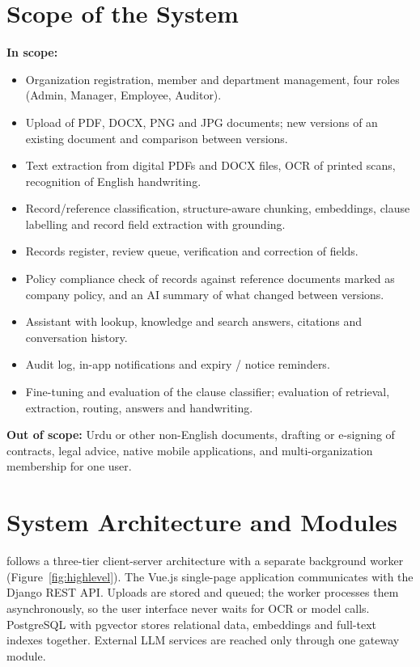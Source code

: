 \section{Scope of the System}
\textbf{In scope:}
\begin{itemize}
\item Organization registration, member and department management, four roles (Admin, Manager,
Employee, Auditor).
\item Upload of PDF, DOCX, PNG and JPG documents; new versions of an existing document and comparison
between versions.
\item Text extraction from digital PDFs and DOCX files, OCR of printed scans, recognition of English
handwriting.
\item Record/reference classification, structure-aware chunking, embeddings, clause labelling and record
field extraction with grounding.
\item Records register, review queue, verification and correction of fields.
\item Policy compliance check of records against reference documents marked as company policy, and an
AI summary of what changed between versions.
\item Assistant with lookup, knowledge and search answers, citations and conversation history.
\item Audit log, in-app notifications and expiry / notice reminders.
\item Fine-tuning and evaluation of the clause classifier; evaluation of retrieval, extraction, routing,
answers and handwriting.
\end{itemize}
\textbf{Out of scope:} Urdu or other non-English documents, drafting or e-signing of contracts, legal
advice, native mobile applications, and multi-organization membership for one user.

\section{System Architecture and Modules}
\sysname{} follows a three-tier client-server architecture with a separate background worker
(Figure~\ref{fig:highlevel}). The Vue.js single-page application communicates with the Django REST
API. Uploads are stored and queued; the worker processes them asynchronously, so the user interface
never waits for OCR or model calls. PostgreSQL with pgvector stores relational data, embeddings and
full-text indexes together. External LLM services are reached only through one gateway module.

